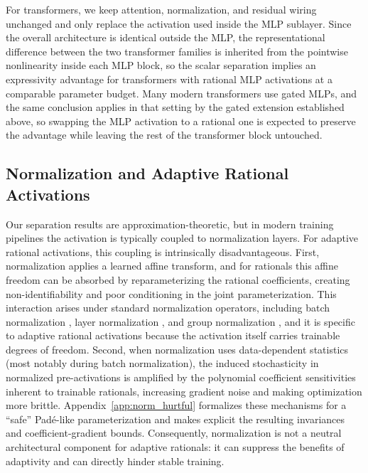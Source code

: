 \documentclass{article}
\theoremstyle{plain}
\theoremstyle{definition}
\theoremstyle{remark}
\begin{document}
For transformers, we keep attention, normalization, and residual wiring unchanged and only replace the activation used inside the MLP sublayer. Since the overall architecture is identical outside the MLP, the representational difference between the two transformer families is inherited from the pointwise nonlinearity inside each MLP block, so the scalar separation implies an expressivity advantage for transformers with rational MLP activations at a comparable parameter budget. Many modern transformers use gated MLPs, and the same conclusion applies in that setting by the gated extension established above, so swapping the MLP activation to a rational one is expected to preserve the advantage while leaving the rest of the transformer block untouched.

\subsection{Normalization and Adaptive Rational Activations}
\label{subsec:norm_hurtful}

Our separation results are approximation-theoretic, but in modern training pipelines the activation is typically coupled to normalization layers. For adaptive rational activations, this coupling is intrinsically disadvantageous. First, normalization applies a learned affine transform, and for rationals this affine freedom can be absorbed by reparameterizing the rational coefficients, creating non-identifiability and poor conditioning in the joint parameterization. This interaction arises under standard normalization operators, including batch normalization \citep{ioffe2015batch}, layer normalization \citep{ba2016layer}, and group normalization \citep{wu2018group}, and it is specific to {adaptive} rational activations because the activation itself carries trainable degrees of freedom. Second, when normalization uses data-dependent statistics (most notably during batch normalization), the induced stochasticity in normalized pre-activations is amplified by the polynomial coefficient sensitivities inherent to trainable rationals, increasing gradient noise and making optimization more brittle. Appendix~\ref{app:norm_hurtful} formalizes these mechanisms for a ``safe'' Pad\'e-like parameterization and makes explicit the resulting invariances and coefficient-gradient bounds. Consequently, normalization is not a neutral architectural component for adaptive rationals: it can suppress the benefits of adaptivity and can directly hinder stable training.
\end{document}
